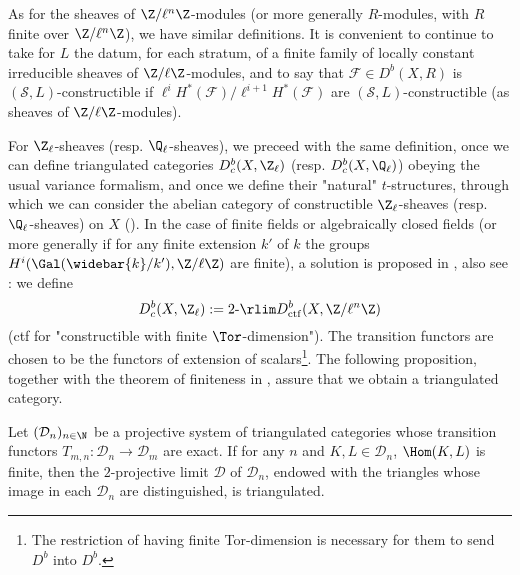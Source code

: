As for the sheaves of $\Z/\ell^n\Z$-modules (or more generally $R$-modules, with $R$ finite over $\Z/\ell^n\Z$), we have similar definitions. It is convenient to continue to take for $L$ the datum, for each stratum, of a finite family of locally constant irreducible sheaves of $\Z/\ell\Z$-modules, and to say that $\mathscr{F}\in D^b(X,R)$ is $(\mathcal{S},L)$-constructible if $\ell^iH^*(\mathscr{F})/\ell^{i+1}H^*(\mathscr{F})$ are $(\mathcal{S},L)$-constructible (as sheaves of $\Z/\ell\Z$-modules).\par

For $\Z_\ell$-sheaves (resp. $\Q_\ell$-sheaves), we preceed with the same definition, once we can define triangulated categories $D_c^b(X,\Z_\ell)$ (resp. $D^b_c(X,\Q_\ell)$) obeying the usual variance formalism, and once we define their "natural" $t$-structures, through which we can consider the abelian category of constructible $\Z_\ell$-sheaves (resp. $\Q_\ell$-sheaves) on $X$ (\cite[XII 1.1]{SGA5}). In the case of finite fields or algebraically closed fields (or more generally if for any finite extension $k'$ of $k$ the groups $H^i(\Gal(\widebar{k}/k'),\Z/\ell\Z)$ are finite), a solution is proposed in \cite[1.2.1]{Deligne_WeilII}, also see \cite{FK}: we define
\begin{equation*}
D^b_c(X,\Z_\ell):=\text{2-}\rlim D^b_{\mathrm{ctf}}(X,\Z/\ell^n\Z)
\end{equation*}
(ctf for "constructible with finite $\Tor$-dimension"). The transition functors are chosen to be the functors of extension of scalars\footnote{The restriction of having finite Tor-dimension is necessary for them to send $D^b$ into $D^b$.}. The following proposition, together with the theorem of finiteness in \cite[XII]{SGA4.5}, assure that we obtain a triangulated category.

\begin{proposition}\label{triangle cat 2-proj limit triangle if finite Hom}
Let $(\mathcal{D}_n)_{n\in\N}$ be a projective system of triangulated categories whose transition functors $T_{m,n}:\mathcal{D}_n\to\mathcal{D}_m$ are exact. If for any $n$ and $K,L\in\mathcal{D}_n$, $\Hom(K,L)$ is finite, then the $2$-projective limit $\mathcal{D}$ of $\mathcal{D}_n$, endowed with the triangles whose image in each $\mathcal{D}_n$ are distinguished, is triangulated.
\end{proposition}

